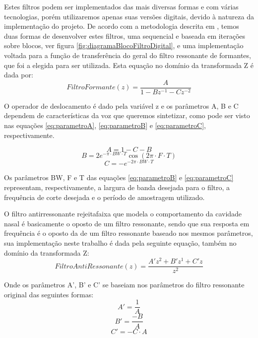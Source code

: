 \documentclass[
  12pt,       
  openright,      
  twoside,      
  a4paper,      
  english,      
  french,       
  spanish,      
  brazil,     
  ]{abntex2}
\begin{document}
Estes filtros podem ser implementados das mais diversas formas e com várias tecnologias, porém utilizaremos apenas suas versões digitais, devido à natureza da implementação do projeto. De acordo com a metodologia descrita em , temos duas formas de desenvolver estes filtros, uma sequencial e baseada em iterações sobre blocos, ver figura \ref{fig:diagramaBlocoFiltroDigital}, e uma implementação voltada para a função de transferência do geral do filtro ressonante de formantes, que foi a elegida para ser utilizada. Esta equação no domínio da transformada Z é dada por:
\begin{equation}
\label{eq:filtroRessonante}
FiltroFormante(z) = \frac{A}{1 - Bz^{-1} - Cz^{-2} }
\end{equation}

O operador de deslocamento é dado pela variável z e os parâmetros A, B e C dependem de características da voz que queremos sintetizar, como pode ser visto nas equações \ref{eq:parametroA}, \ref{eq:parametroB} e \ref{eq:parametroC}, respectivamente.

\begin{equation}
\label{eq:parametroA}
A = 1 - C - B 
\end{equation}
\begin{equation}
\label{eq:parametroB}
B = 2e^{-\pi \cdot BW \cdot T}\cos(2\pi \cdot F \cdot T)
\end{equation}
\begin{equation}
\label{eq:parametroC}
C = -e^{-2\pi \cdot BW \cdot T}
\end{equation}

Os parâmetros BW, F e T das equações \ref{eq:parametroB} e \ref{eq:parametroC} representam, respectivamente, a largura de banda desejada para o filtro, a frequência de corte desejada e o período de amostragem utilizado.

O filtro antirressonante rejeitafaixa que modela o comportamento da cavidade nasal é basicamente o oposto de um filtro ressonante, sendo que sua resposta em frequência é o oposto da de um filtro ressonante baseado nos mesmos parâmetros, sua implementação neste trabalho é dada pela seguinte equação, também no domínio da transformada Z:
\begin{equation}
\label{eq:filtroAntiRessonante}
FiltroAntiRessonante(z) = \frac{A'z^{2} + B'z^{1} + C'z}{z^{2}}
\end{equation}

Onde os parâmetros A', B' e C' se baseiam nos parâmetros do filtro ressonante original das seguintes formas: 
\begin{equation}
\label{eq:antiA}
A' = \frac{1}{A}
\end{equation}
\begin{equation}
\label{eq:antiB}
B' = \frac{-B}{A}
\end{equation}
\begin{equation}
\label{eq:antiC}
C' = -C \cdot A
\end{equation}
\end{document}

